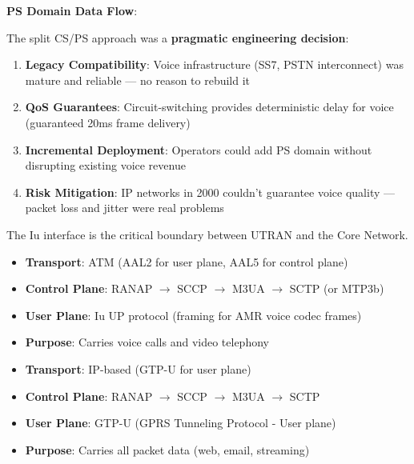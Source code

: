 
\textbf{PS Domain Data Flow}:



The split CS/\allowbreak{}PS approach was a \textbf{pragmatic engineering decision}:

\begin{enumerate}
\def\labelenumi{\arabic{enumi}.}
\tightlist
\item
  \textbf{Legacy Compatibility}: Voice infrastructure (SS7, PSTN interconnect) was mature and reliable — no reason to rebuild it
\item
  \textbf{QoS Guarantees}: Circuit-switching provides deterministic delay for voice (guaranteed 20ms frame delivery)
\item
  \textbf{Incremental Deployment}: Operators could add PS domain without disrupting existing voice revenue
\item
  \textbf{Risk Mitigation}: IP networks in 2000 couldn’t guarantee voice quality — packet loss and jitter were real problems
\end{enumerate}


The Iu interface is the critical boundary between UTRAN and the Core Network.


\begin{itemize}
\tightlist
\item
  \textbf{Transport}: ATM (AAL2 for user plane, AAL5 for control plane)
\item
  \textbf{Control Plane}: RANAP \ensuremath{\to} SCCP \ensuremath{\to} M3UA \ensuremath{\to} SCTP (or MTP3b)
\item
  \textbf{User Plane}: Iu UP protocol (framing for AMR voice codec frames)
\item
  \textbf{Purpose}: Carries voice calls and video telephony
\end{itemize}


\begin{itemize}
\tightlist
\item
  \textbf{Transport}: IP-based (GTP-U for user plane)
\item
  \textbf{Control Plane}: RANAP \ensuremath{\to} SCCP \ensuremath{\to} M3UA \ensuremath{\to} SCTP
\item
  \textbf{User Plane}: GTP-U (GPRS Tunneling Protocol - User plane)
\item
  \textbf{Purpose}: Carries all packet data (web, email, streaming)
\end{itemize}

